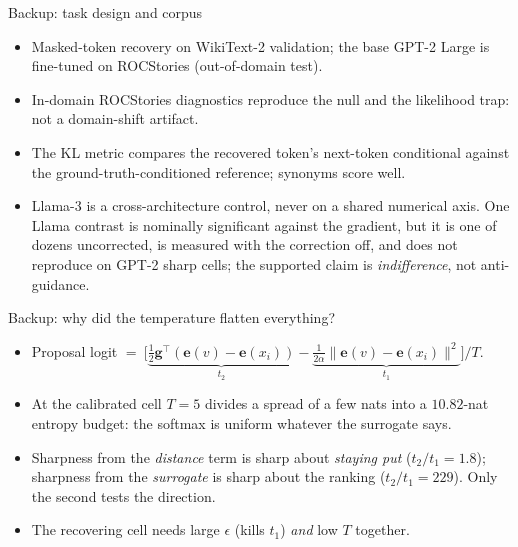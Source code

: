 \documentclass{beamer}
\begin{document}
\begin{frame}[noframenumbering]{Backup: task design and corpus}
  \small
  \begin{itemize}
    \item Masked-token recovery on WikiText-2 validation; the base GPT-2 Large is fine-tuned on ROCStories (out-of-domain test).
    \item In-domain ROCStories diagnostics reproduce the null and the likelihood trap: not a domain-shift artifact.
    \item The KL metric compares the recovered token's next-token conditional against the ground-truth-conditioned reference; synonyms score well.
    \item Llama-3 is a cross-architecture control, never on a shared numerical axis. One Llama contrast is nominally significant against the gradient, but it is one of dozens uncorrected, is measured with the correction off, and does not reproduce on GPT-2 sharp cells; the supported claim is \emph{indifference}, not anti-guidance.
  \end{itemize}
\end{frame}

\begin{frame}[noframenumbering]{Backup: why did the temperature flatten everything?}
  \small
  \begin{itemize}
    \item Proposal logit $=\ \big[\underbrace{\tfrac12 \bm{g}^\top(\bm{e}(v)-\bm{e}(x_i))}_{t_2} - \underbrace{\tfrac{1}{2\alpha}\lVert \bm{e}(v)-\bm{e}(x_i)\rVert^2}_{t_1}\big] / T$.
    \item At the calibrated cell $T=5$ divides a spread of a few nats into a $10.82$-nat entropy budget: the softmax is uniform whatever the surrogate says.
    \item Sharpness from the \emph{distance} term is sharp about \emph{staying put} ($t_2/t_1 = 1.8$); sharpness from the \emph{surrogate} is sharp about the ranking ($t_2/t_1 = 229$). Only the second tests the direction.
    \item The recovering cell needs large $\epsilon$ (kills $t_1$) \emph{and} low $T$ together.
  \end{itemize}
\end{frame}
\end{document}
